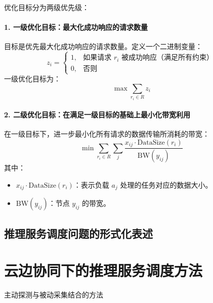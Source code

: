 优化目标分为两级优先级：

\paragraph*{1. 一级优化目标：最大化成功响应的请求数量}

目标是优先最大化成功响应的请求数量。定义一个二进制变量：
\[
z_i = 
\begin{cases} 
1, & \text{如果请求 } r_i \text{ 被成功响应（满足所有约束）} \\
0, & \text{否则}
\end{cases}
\]
一级优化目标为：
\[
\max \sum_{r_i \in R} z_i
\]

\paragraph*{2. 二级优化目标：在满足一级目标的基础上最小化带宽利用}

在一级目标下，进一步最小化所有请求的数据传输所消耗的带宽：
\[
\min \sum_{r_i \in R} \sum_{j} \frac{x_{ij} \cdot \text{DataSize}(r_i)}{\text{BW}(y_{ij})}
\]
其中：
\begin{itemize}
    \item \( x_{ij} \cdot \text{DataSize}(r_i) \)：表示负载 \( a_j \) 处理的任务对应的数据大小。
    \item \( \text{BW}(y_{ij}) \)：节点 \( y_{ij} \) 的带宽。
\end{itemize}





\subsection{推理服务调度问题的形式化表述}

\section{云边协同下的推理服务调度方法}




主动探测与被动采集结合的方法
